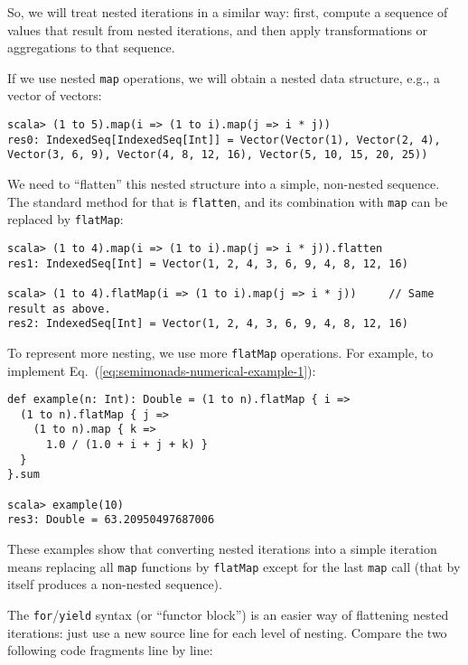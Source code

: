 So, we will treat nested iterations in a similar way: first, compute
a sequence of values that result from nested iterations, and then
apply transformations or aggregations to that sequence.

If we use nested \lstinline!map! operations, we will obtain a nested
data structure, e.g., a vector of vectors:
\begin{lstlisting}
scala> (1 to 5).map(i => (1 to i).map(j => i * j))
res0: IndexedSeq[IndexedSeq[Int]] = Vector(Vector(1), Vector(2, 4), Vector(3, 6, 9), Vector(4, 8, 12, 16), Vector(5, 10, 15, 20, 25))
\end{lstlisting}
We need to \textsf{``}flatten\textsf{''} this nested structure into a simple, non-nested
sequence. The standard method for that is \lstinline!flatten!, and
its combination with \lstinline!map! can be replaced by \lstinline!flatMap!:
\begin{lstlisting}
scala> (1 to 4).map(i => (1 to i).map(j => i * j)).flatten
res1: IndexedSeq[Int] = Vector(1, 2, 4, 3, 6, 9, 4, 8, 12, 16)

scala> (1 to 4).flatMap(i => (1 to i).map(j => i * j))     // Same result as above.
res2: IndexedSeq[Int] = Vector(1, 2, 4, 3, 6, 9, 4, 8, 12, 16)
\end{lstlisting}
To represent more nesting, we use more \lstinline!flatMap! operations.
For example, to implement Eq.~(\ref{eq:semimonads-numerical-example-1}):
\begin{lstlisting}
def example(n: Int): Double = (1 to n).flatMap { i =>
  (1 to n).flatMap { j =>
    (1 to n).map { k => 
      1.0 / (1.0 + i + j + k) }
  }
}.sum

scala> example(10)
res3: Double = 63.20950497687006
\end{lstlisting}
These examples show that converting nested iterations into a simple
iteration means replacing all \lstinline!map! functions by \lstinline!flatMap!
except for the last \lstinline!map! call (that by itself produces
a non-nested sequence).

The \lstinline!for!/\lstinline!yield! syntax (or \textsf{``}functor block\textsf{''})
is an easier way of flattening nested iterations: just use a new source
line for each level of nesting. Compare the two following code fragments
line by line:

